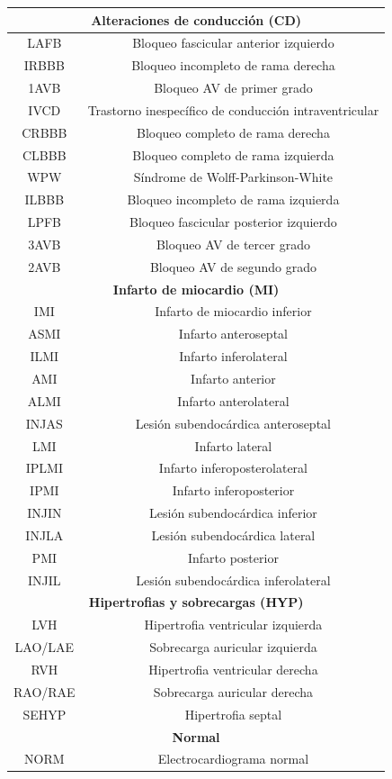 \documentclass[12pt,a4paper,twoside]{book}
\begin{document}
\begin{longtable}{|c|c|}
\hline
\multicolumn{2}{|c|}{\textbf{Alteraciones de conducción (CD)}} \\
\hline
LAFB  & Bloqueo fascicular anterior izquierdo \\
IRBBB & Bloqueo incompleto de rama derecha \\
1AVB  & Bloqueo AV de primer grado \\
IVCD  & Trastorno inespecífico de conducción intraventricular \\
CRBBB & Bloqueo completo de rama derecha \\
CLBBB & Bloqueo completo de rama izquierda \\
WPW   & Síndrome de Wolff-Parkinson-White \\
ILBBB & Bloqueo incompleto de rama izquierda \\
LPFB  & Bloqueo fascicular posterior izquierdo \\
3AVB  & Bloqueo AV de tercer grado \\
2AVB  & Bloqueo AV de segundo grado \\

\hline
\multicolumn{2}{|c|}{\textbf{Infarto de miocardio (MI)}} \\
\hline
IMI   & Infarto de miocardio inferior \\
ASMI  & Infarto anteroseptal \\
ILMI  & Infarto inferolateral \\
AMI   & Infarto anterior \\
ALMI  & Infarto anterolateral \\
INJAS & Lesión subendocárdica anteroseptal \\
LMI   & Infarto lateral \\
IPLMI & Infarto inferoposterolateral \\
IPMI  & Infarto inferoposterior \\
INJIN & Lesión subendocárdica inferior \\
INJLA & Lesión subendocárdica lateral \\
PMI   & Infarto posterior \\
INJIL & Lesión subendocárdica inferolateral \\

\hline
\multicolumn{2}{|c|}{\textbf{Hipertrofias y sobrecargas (HYP)}} \\
\hline
LVH     & Hipertrofia ventricular izquierda \\
LAO/LAE & Sobrecarga auricular izquierda \\
RVH     & Hipertrofia ventricular derecha \\
RAO/RAE & Sobrecarga auricular derecha \\
SEHYP   & Hipertrofia septal \\

\hline
\multicolumn{2}{|c|}{\textbf{Normal}} \\
\hline
NORM & Electrocardiograma normal \\

\hline
	
\end{longtable}
\end{document}
